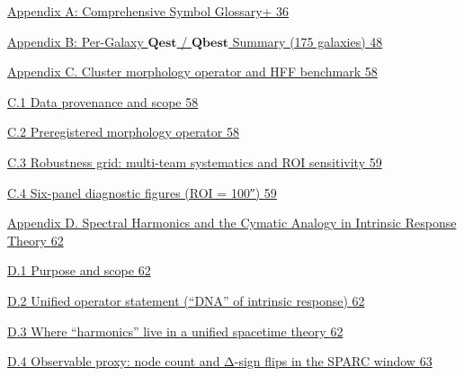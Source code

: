 \documentclass[11pt]{article}
\begin{document}
\hyperref[appendix-a-comprehensive-symbol-glossary]{Appendix A: Comprehensive Symbol Glossary+ \hyperref[appendix-a-comprehensive-symbol-glossary]{36}}

\hyperref[appendix-b-per-galaxy-mathbfq_mathbfest-mathbfq_mathbfbest-summary-175-galaxies]{Appendix B: Per-Galaxy \(\mathbf{Qest}\) / \(\mathbf{Qbest}\) Summary (175 galaxies) \hyperref[appendix-b-per-galaxy-mathbfq_mathbfest-mathbfq_mathbfbest-summary-175-galaxies]{48}}

\hyperref[appendix-c.-cluster-morphology-operator-and-hff-benchmark]{Appendix C. Cluster morphology operator and HFF benchmark \hyperref[appendix-c.-cluster-morphology-operator-and-hff-benchmark]{58}}

\hyperref[c.1-data-provenance-and-scope]{C.1 Data provenance and scope \hyperref[c.1-data-provenance-and-scope]{58}}

\hyperref[c.2-preregistered-morphology-operator]{C.2 Preregistered morphology operator \hyperref[c.2-preregistered-morphology-operator]{58}}

\hyperref[c.3-robustness-grid-multi-team-systematics-and-roi-sensitivity]{C.3 Robustness grid: multi-team systematics and ROI sensitivity \hyperref[c.3-robustness-grid-multi-team-systematics-and-roi-sensitivity]{59}}

\hyperref[c.4-six-panel-diagnostic-figures-roi-100]{C.4 Six-panel diagnostic figures (ROI = 100″) \hyperref[c.4-six-panel-diagnostic-figures-roi-100]{59}}

\hyperref[appendix-d.-spectral-harmonics-and-the-cymatic-analogy-in-intrinsic-response-theory]{Appendix D. Spectral Harmonics and the Cymatic Analogy in Intrinsic Response Theory \hyperref[appendix-d.-spectral-harmonics-and-the-cymatic-analogy-in-intrinsic-response-theory]{62}}

\hyperref[d.1-purpose-and-scope]{D.1 Purpose and scope \hyperref[d.1-purpose-and-scope]{62}}

\hyperref[d.2-unified-operator-statement-dna-of-intrinsic-response]{D.2 Unified operator statement (``DNA'' of intrinsic response) \hyperref[d.2-unified-operator-statement-dna-of-intrinsic-response]{62}}

\hyperref[d.3-where-harmonics-live-in-a-unified-spacetime-theory]{D.3 Where ``harmonics'' live in a unified spacetime theory \hyperref[d.3-where-harmonics-live-in-a-unified-spacetime-theory]{62}}

\hyperref[d.4-observable-proxy-node-count-and-ux3b4-sign-flips-in-the-sparc-window]{D.4 Observable proxy: node count and Δ-sign flips in the SPARC window \hyperref[d.4-observable-proxy-node-count-and-ux3b4-sign-flips-in-the-sparc-window]{63}}
\end{document}
